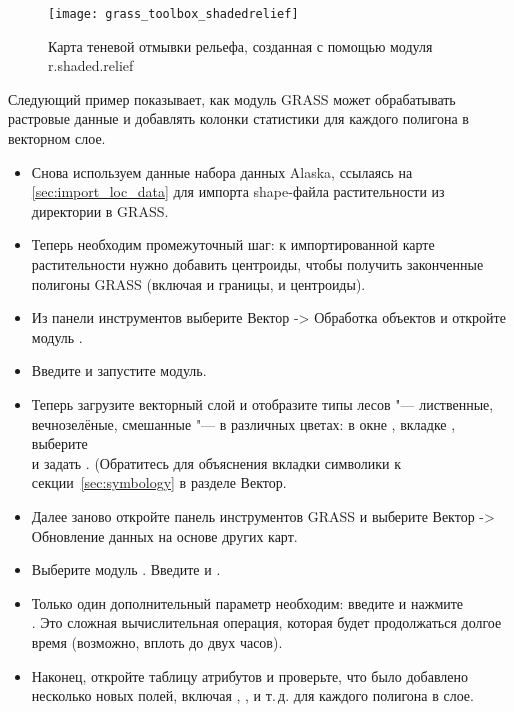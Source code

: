 \begin{figure}[ht]
 \centering
 \texttt{[image: grass\_toolbox\_shadedrelief]}
 \caption{Карта теневой отмывки рельефа, созданная с помощью модуля
   r.shaded.relief \wincaption}\label{fig:grass_toolbox_shadedrelief}
\end{figure}


Следующий пример показывает, как модуль GRASS может обрабатывать
растровые данные и добавлять колонки статистики для каждого полигона в
векторном слое.

\begin{itemize}[label=--]
\item Снова используем данные набора данных Alaska, ссылаясь на
\ref{sec:import_loc_data} для импорта shape-файла растительности из
директории  в GRASS.
\item Теперь необходим промежуточный шаг: к импортированной карте
растительности нужно добавить центроиды, чтобы получить законченные
полигоны GRASS (включая и границы, и центроиды).
\item Из панели инструментов выберите Вектор -> Обработка объектов и
откройте модуль .
\item Введите 
и запустите модуль.
\item Теперь загрузите векторный слой  и
отобразите типы лесов "--- лиственные, вечнозелёные, смешанные "--- в
различных цветах: в окне , вкладке
, выберите \\
 и задать
. (Обратитесь для
объяснения вкладки символики к секции~\ref{sec:symbology} в разделе
Вектор.
\item Далее заново откройте панель инструментов GRASS и выберите
Вектор -> Обновление данных на основе других карт.
\item Выберите модуль . Введите
 и .
\item Только один дополнительный параметр необходим: введите
 и нажмите \\
. Это сложная вычислительная операция, которая будет
продолжаться долгое время (возможно, вплоть до двух часов).
\item Наконец, откройте таблицу атрибутов  и
проверьте, что было добавлено несколько новых полей, включая
, ,  и
т.\,д. для каждого полигона в слое.
\end{itemize}


